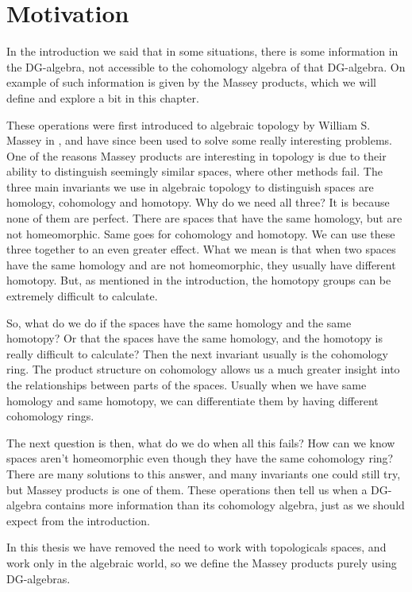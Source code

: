 
\section{Motivation}

In the introduction we said that in some situations, there is some information in the DG-algebra, not accessible to the cohomology algebra of that DG-algebra. On example of such information is given by the Massey products, which we will define and explore a bit in this chapter. 

These operations were first introduced to algebraic topology by William S. Massey in \cite{massey}, and have since been used to solve some really interesting problems. One of the reasons Massey products are interesting in topology is due to their ability to distinguish seemingly similar spaces, where other methods fail. The three main invariants we use in algebraic topology to distinguish spaces are homology, cohomology and homotopy. Why do we need all three? It is because none of them are perfect. There are spaces that have the same homology, but are not homeomorphic. Same goes for cohomology and homotopy. We can use these three together to an even greater effect. What we mean is that when two spaces have the same homology and are not homeomorphic, they usually have different homotopy. But, as mentioned in the introduction, the homotopy groups can be extremely difficult to calculate. 

So, what do we do if the spaces have the same homology and the same homotopy? Or that the spaces have the same homology, and the homotopy is really difficult to calculate? Then the next invariant usually is the cohomology ring. The product structure on cohomology allows us a much greater insight into the relationships between parts of the spaces. Usually when we have same homology and same homotopy, we can differentiate them by having different cohomology rings. 

The next question is then, what do we do when all this fails? How can we know spaces aren't homeomorphic even though they have the same cohomology ring? There are many solutions to this answer, and many invariants one could still try, but Massey products is one of them. These operations then tell us when a DG-algebra contains more information than its cohomology algebra, just as we should expect from the introduction. 

In this thesis we have removed the need to work with topologicals spaces, and work only in the algebraic world, so we define the Massey products purely using DG-algebras.  

